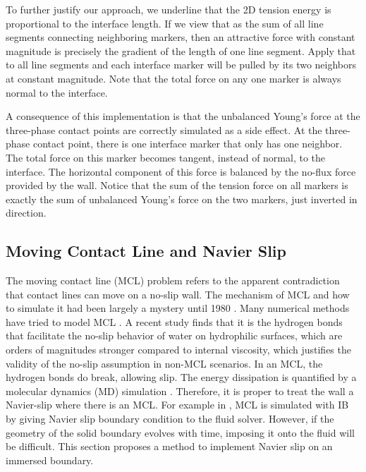 \documentclass{jfm}
\newcommand{\daniel}[1]{\todo[inline,color=yellow!40]{Daniel: #1}}
\begin{document}
To further justify our approach, we underline that the 2D tension energy is proportional to the interface length. If we view that as the sum of all line segments connecting neighboring markers, then an attractive force with constant magnitude is precisely the gradient of the length of one line segment. Apply that to all line segments and each interface marker will be pulled by its two neighbors at constant magnitude. Note that the total force on any one marker is always normal to the interface. 

A consequence of this implementation is that the unbalanced Young’s force at the three-phase contact points are correctly simulated as a side effect. At the three-phase contact point, there is one interface marker that only has one neighbor. The total force on this marker becomes tangent, instead of normal, to the interface. The horizontal component of this force is balanced by the no-flux force provided by the wall. Notice that the sum of the tension force on all markers is exactly the sum of unbalanced Young’s force on the two markers, just inverted in direction. 
\daniel{image}

\subsection{Moving Contact Line and Navier Slip}
The moving contact line (MCL) problem refers to the apparent contradiction that contact lines can move on a no-slip wall. The mechanism of MCL and how to simulate it had been largely a mystery until 1980 \cite{1979_MCL_confusion}. Many numerical methods have tried to model MCL \cite{2014_MCL_review, curved_solid_DI_IB}. A recent study \cite{its_the_bonds_original} finds that it is the hydrogen bonds that facilitate the no-slip behavior of water on hydrophilic surfaces, which are orders of magnitudes stronger compared to internal viscosity, which justifies the validity of the no-slip assumption in non-MCL scenarios. In an MCL, the hydrogen bonds do break, allowing slip. The energy dissipation is quantified by a molecular dynamics (MD) simulation \cite{MD_2018_its_the_bonds}. Therefore, it is proper to treat the wall a Navier-slip where there is an MCL. For example in \cite{MCL_IBM_surfactant}, MCL is simulated with IB by giving Navier slip boundary condition to the fluid solver. However, if the geometry of the solid boundary evolves with time, imposing it onto the fluid will be difficult. This section proposes a method to implement Navier slip on an immersed boundary. 
\end{document}
